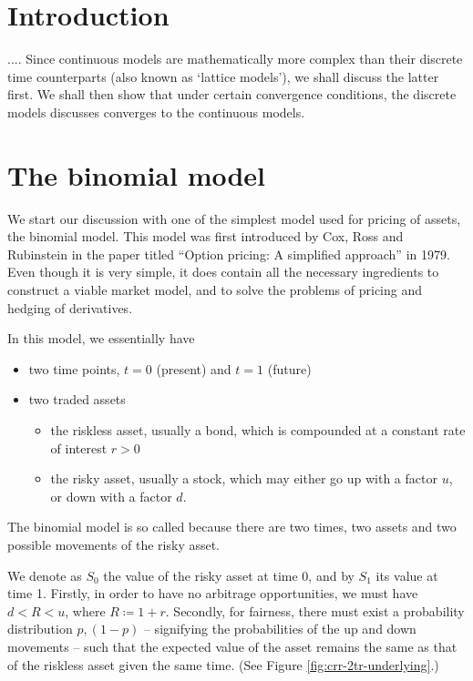 

\section{Introduction}
\label{sec:crr-intro}
.... Since continuous models are mathematically more complex than their discrete time counterparts (also known as `lattice models'), we shall discuss the latter first. We shall then show that under certain convergence conditions, the discrete models discusses converges to the continuous models.

\section{The binomial model}
\label{sec:crr-binom-model}

We start our discussion with one of the simplest model used for pricing of assets, the binomial model. This model was first introduced by Cox, Ross and Rubinstein \cite{Cox1979} in the paper titled ``Option pricing: A simplified approach'' in 1979. Even though it is very simple, it does contain all the necessary ingredients to construct a viable market model, and to solve the problems of pricing and hedging of derivatives.

In this model, we essentially have
\begin{itemize}
	\item two time points, $ t = 0 $ (present) and $ t = 1 $ (future)
	\item two traded assets
	\begin{itemize}
		\item the riskless asset, usually a bond, which is compounded at a constant rate of interest $ r > 0 $
		\item the risky asset, usually a stock, which may either go up with a factor $ u $, or down with a factor $ d $.
	\end{itemize}
\end{itemize}
The binomial model is so called because there are two times, two assets and two possible movements of the risky asset.

We denote as $ S_0 $ the value of the risky asset at time 0, and by $ S_1 $ its value at time 1. Firstly, in order to have no arbitrage opportunities, we must have $ d < R < u $, where $ R \coloneqq 1 + r $. Secondly, for fairness, there must exist a probability distribution $ p, (1-p) $ -- signifying the probabilities of the up and down movements -- such that the expected value of the asset remains the same as that of the riskless asset given the same time. (See Figure \ref{fig:crr-2tr-underlying}.)



